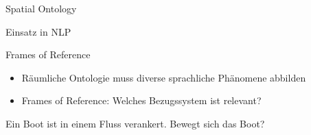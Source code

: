 \documentclass[12pt,a4paper]{beamer}
\begin{document}
\begin{frame}{Spatial Ontology}
\item Einsatz in NLP
\end{frame}




\begin{frame}{Frames of Reference}
\begin{itemize}
\item Räumliche Ontologie muss diverse sprachliche Phänomene abbilden
\item Frames of Reference: Welches Bezugssystem ist relevant?
\end{itemize}

Ein Boot ist in einem Fluss verankert. Bewegt sich das Boot?

\end{frame}
\end{document}
